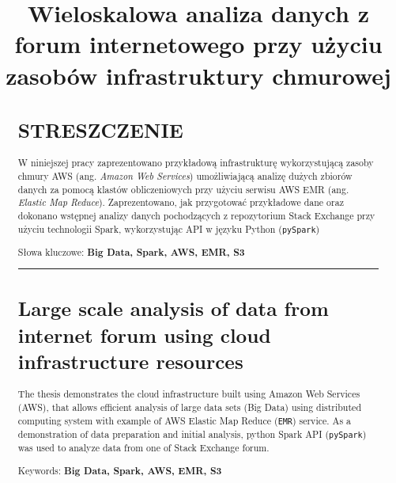 \documentclass[
  letterpaper,
  DIV=11,
  numbers=noendperiod]{scrreprt}
\title{Wieloskalowa analiza danych z forum internetowego przy użyciu
zasobów infrastruktury chmurowej}
\author{}
\date{}
\begin{document}
\maketitle
\begin{abstract}
\hypertarget{streszczenie}{%
\section*{STRESZCZENIE}\label{streszczenie}}


W niniejszej pracy zaprezentowano przykładową infrastrukturę
wykorzystującą zasoby chmury AWS (ang. \emph{Amazon Web Services})
umożliwiającą analizę dużych zbiorów danych za pomocą klastów
obliczeniowych przy użyciu serwisu AWS EMR (ang. \emph{Elastic Map
Reduce}). Zaprezentowano, jak przygotować przykładowe dane oraz dokonano
wstępnej analizy danych pochodzących z repozytorium Stack Exchange przy
użyciu technologii Spark, wykorzystując API w języku Python
(\texttt{pySpark})

Słowa kluczowe: \textbf{Big Data, Spark, AWS, EMR, S3}

\begin{center}\rule{0.5\linewidth}{0.5pt}\end{center}

\hypertarget{large-scale-analysis-of-data-from-internet-forum-using-cloud-infrastructure-resources}{%
\section*{Large scale analysis of data from internet forum using cloud
infrastructure
resources}\label{large-scale-analysis-of-data-from-internet-forum-using-cloud-infrastructure-resources}}


The thesis demonstrates the cloud infrastructure built using Amazon Web
Services (AWS), that allows efficient analysis of large data sets (Big
Data) using distributed computing system with example of AWS Elastic Map
Reduce (\texttt{EMR}) service. As a demonstration of data preparation
and initial analysis, python Spark API (\texttt{pySpark}) was used to
analyze data from one of Stack Exchange forum.

Keywords: \textbf{Big Data, Spark, AWS, EMR, S3}
\end{abstract}
\ifdefined\Shaded\renewenvironment{Shaded}{\begin{tcolorbox}[enhanced, boxrule=0pt, borderline west={3pt}{0pt}{shadecolor}, sharp corners, frame hidden, interior hidden, breakable]}{\end{tcolorbox}}\fi
\end{document}
